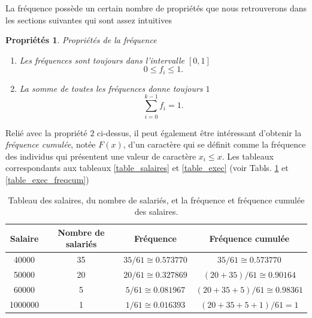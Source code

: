 \documentclass[a4paper,12pt]{book}
\newtheorem{proprietes}{Propriétés}
\begin{document}
La fréquence possède un certain nombre de propriétés que nous retrouverons 
dans les sections suivantes qui sont assez intuitives
\begin{proprietes}{Propriétés de la fréquence}
 \begin{enumerate}
  \item Les fréquences sont toujours dans l'intervalle $[0,1]$
  \begin{equation}
    0\leq f_i\leq 1.
  \end{equation}
  \item La somme de toutes les fréquences donne toujours $1$
  \begin{equation}
  \sum_{i=0}^{k-1} f_i = 1.
  \end{equation}

 \end{enumerate}

\end{proprietes}
Relié avec la propriété $2$ ci-dessus, il peut également être intéressant d'obtenir la
\textit{fréquence cumulée}, notée $F(x)$, d'un caractère qui se définit comme la fréquence des individus 
qui présentent une valeur de caractère $x_i\leq x$. Les tableaux correspondants aux tableaux 
\ref{table_salaires} et \ref{table_exec} (voir Tabls. \ref{table_salaires_freqcum} et \ref{table_exec_freqcum})
  \begin{table}[htp]
  \begin{center}
  \begin{tabular}{|c|c|c|c|}
  \hline
  Salaire & Nombre de salariés & Fréquence & Fréquence cumulée\\
  \hline\hline
  40000 & 35 & $35/61\cong0.573770$ & $35/61\cong0.573770$\\
  \hline
  50000 & 20 & $20/61\cong0.327869$ & $(20+35)/61\cong0.90164$\\
  \hline
  60000 & 5 & $5/61\cong0.081967$ & $(20+35+5)/61\cong0.98361$\\
  \hline
  1000000 & 1 & $1/61\cong0.016393$ & $(20+35+5+1)/61=1$\\
  \hline
  \end{tabular}
  \end{center}
  \caption{Tableau des salaires, du nombre de salariés, et la fréquence et fréquence cumulée des salaires.}\label{table_salaires_freqcum}
  \end{table}
  
\end{document}
